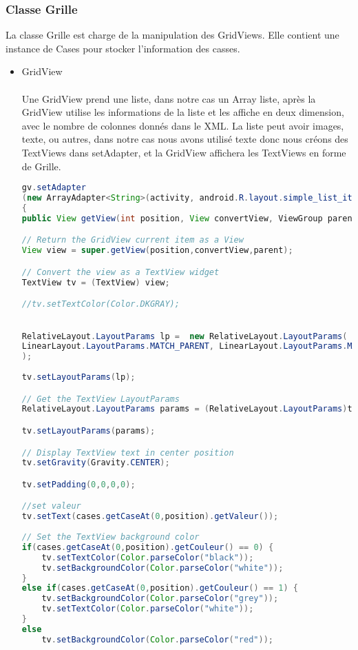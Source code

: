 \documentclass{article}
\begin{document}
\subsubsection{Classe Grille}
La classe Grille est charge de la manipulation des GridViews. Elle contient une instance de Cases pour stocker l'information des casses.

\begin{itemize}

\item{GridView}
\\
\\
Une GridView prend une liste, dans notre cas un Array liste, après la GridView utilise les informations de la liste et les affiche en deux dimension, avec le nombre de colonnes donnés dans le XML. La liste peut avoir images, texte, ou autres, dans notre cas nous avons utilisé texte donc nous créons des TextViews dans setAdapter, et la GridView affichera les TextViews en forme de Grille.

\begin{lstlisting}[language=Java, caption = Exemple setAdapter] 
gv.setAdapter
(new ArrayAdapter<String>(activity, android.R.layout.simple_list_item_1, numbers.get(0))
{
public View getView(int position, View convertView, ViewGroup parent) {

// Return the GridView current item as a View
View view = super.getView(position,convertView,parent);

// Convert the view as a TextView widget
TextView tv = (TextView) view;

//tv.setTextColor(Color.DKGRAY);

                
RelativeLayout.LayoutParams lp =  new RelativeLayout.LayoutParams(
LinearLayout.LayoutParams.MATCH_PARENT, LinearLayout.LayoutParams.MATCH_PARENT
);
    
tv.setLayoutParams(lp);

// Get the TextView LayoutParams
RelativeLayout.LayoutParams params = (RelativeLayout.LayoutParams)tv.getLayoutParams();

tv.setLayoutParams(params);

// Display TextView text in center position
tv.setGravity(Gravity.CENTER);

tv.setPadding(0,0,0,0);

//set valeur
tv.setText(cases.getCaseAt(0,position).getValeur());
                
// Set the TextView background color
if(cases.getCaseAt(0,position).getCouleur() == 0) {
    tv.setTextColor(Color.parseColor("black"));
    tv.setBackgroundColor(Color.parseColor("white"));
}
else if(cases.getCaseAt(0,position).getCouleur() == 1) {
    tv.setBackgroundColor(Color.parseColor("grey"));
    tv.setTextColor(Color.parseColor("white"));
}
else
    tv.setBackgroundColor(Color.parseColor("red"));
               

\end{lstlisting}
\end{itemize}
\end{document}
